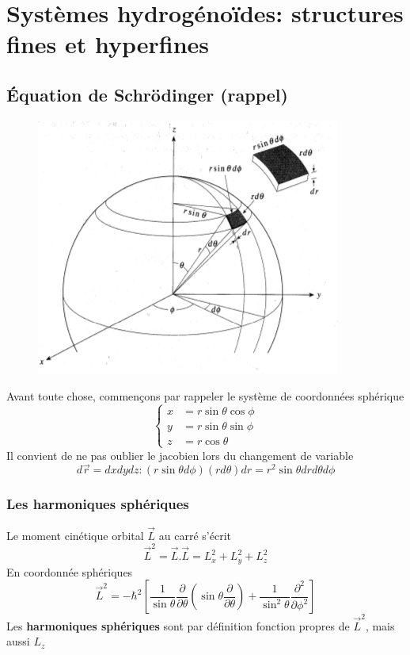 \chapter{Systèmes hydrogénoïdes: structures fines et hyperfines}
\section{Équation de Schrödinger (rappel)}
	\begin{figure}
	\vspace{-18mm}
	\includegraphics[scale=0.4]{ch1/image1}
	\end{figure}
Avant toute chose, commençons par rappeler le système de coordonnées sphérique
\begin{equation}
\left\{\begin{array}{ll}
x &= r\sin\theta\cos\phi\\
y &= r\sin\theta\sin\phi\\
z &= r\cos\theta
\end{array}\right.
\end{equation}
Il convient de ne pas oublier le jacobien lors du changement de variable
\begin{equation}
d\vec{r} = dxdydz : (r\sin\theta d\phi)(rd\theta)dr = r^2\sin\theta drd\theta d\phi
\end{equation}

\subsection{Les harmoniques sphériques}
Le moment cinétique orbital $\vec{L}$ au carré s'écrit
\begin{equation}
\vec{L}^2 = \vec{L}.\vec L = L^2_x+L^2_y+L^2_z
\end{equation}
En coordonnée sphériques
\begin{equation}
\vec L^2 = -\hbar^2\left[\frac{1}{\sin\theta}\frac{\partial}{\partial \theta}\left(\sin\theta\frac{\partial}{
\partial \theta}\right)+\frac{1}{\sin^2\theta}\frac{\partial^2}{\partial\phi^2}\right]
\end{equation}
Les \textbf{harmoniques sphériques} sont par définition fonction propres de $\vec{L}^2$, mais aussi $L_z$\\

